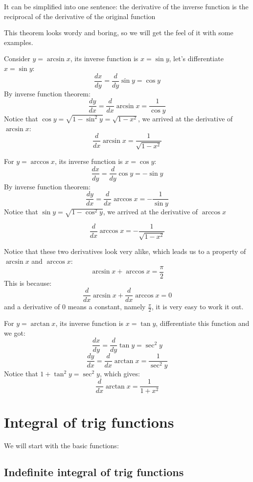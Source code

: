 \documentclass{article}
\begin{document}
It can be simplified into one sentence: the derivative of the inverse function is the reciprocal of the derivative of the original function

This theorem looks wordy and boring, so we will get the feel of it with some examples.

\newpage
Consider $y = \arcsin x$, its inverse function is $x = \sin y$, let's differentiate $x = \sin y$:
\[
    \frac{dx}{dy} = \frac{d}{dy}\sin y = \cos y
\]
By inverse function theorem:
\[
    \frac{dy}{dx} = \frac{d}{dx}\arcsin x = \frac{1}{\cos y }
\]
Notice that $\cos y = \sqrt{1-\sin^2 y} = \sqrt{1 - x^2}$, we arrived at the derivative of $\arcsin x$:
\begin{equation}
    \frac{d}{dx}\arcsin x = \frac{1}{\sqrt{1-x^2}}
\end{equation}

For $y = \arccos x$, its inverse function is $x = \cos y$:
\[
    \frac{dx}{dy} = \frac{d}{dy} \cos y = -\sin y
\]
By inverse function theorem:
\[
    \frac{dy}{dx} = \frac{d}{dx}\arccos x = -\frac{1}{\sin y}
\]
Notice that $\sin y = \sqrt{1-\cos^2 y}$, we arrived at the derivative of $\arccos x$

\begin{equation}
    \frac{d}{dx}\arccos x = -\frac{1}{\sqrt{1-x^2}}
\end{equation}

Notice that these two derivatives look very alike, which leads us to a property of $\arcsin x$ and $\arccos x$:
\begin{equation}
    \arcsin x + \arccos x = \frac{\pi}{2}
\end{equation}
This is because:
\[
    \frac{d}{dx}\arcsin x + \frac{d}{dx}\arccos x = 0
\]
and a derivative of 0 means a constant, namely $\frac{\pi}{2}$, it is very easy to work it out.

For $y = \arctan x$, its inverse function is $x = \tan y$, differentiate this function and we got:
\[
    \frac{dx}{dy} = \frac{d}{dy} \tan y = \sec^2 y
\]
\[
    \frac{dy}{dx} = \frac{d}{dx} \arctan x = \frac{1}{\sec^2 y}
\]
Notice that $1+\tan^2 y = \sec^2 y$, which gives:
\begin{equation}
    \frac{d}{dx} \arctan x = \frac{1}{1+x^2}
\end{equation}
\newpage
\section{Integral of trig functions}
We will start with the basic functions:
\subsection{Indefinite integral of trig functions}
\end{document}
